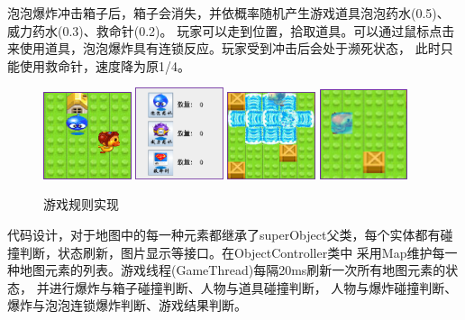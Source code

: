 \documentclass[UTF8, a4paper]{ctexart}
\begin{document}
泡泡爆炸冲击箱子后，箱子会消失，并依概率随机产生游戏道具泡泡药水(0.5)、威力药水(0.3)、救命针(0.2)。
玩家可以走到位置，拾取道具。可以通过鼠标点击来使用道具，泡泡爆炸具有连锁反应。玩家受到冲击后会处于濒死状态，
此时只能使用救命针，速度降为原1/4。
\begin{figure}[h]
    \centering
        {\includegraphics[width=0.23\textwidth]{gameprops.png}}
    \hspace{0.01\textwidth}
        {\includegraphics[width=0.23\textwidth]{userprops.png}}
    \hspace{0.01\textwidth}
        {\includegraphics[width=0.23\textwidth]{serialbomb.png}}
    \hspace{0.01\textwidth}
        {\includegraphics[width=0.23\textwidth]{dying.png}}
    \caption{游戏规则实现}
    \label{fig:gameSetup}
  \end{figure}

 代码设计，对于地图中的每一种元素都继承了superObject父类，每个实体都有碰撞判断，状态刷新，图片显示等接口。在ObjectController类中
 采用Map维护每一种地图元素的列表。游戏线程(GameThread)每隔20ms刷新一次所有地图元素的状态， 并进行爆炸与箱子碰撞判断、人物与道具碰撞判断，
 人物与爆炸碰撞判断、爆炸与泡泡连锁爆炸判断、游戏结果判断。
\end{document}
